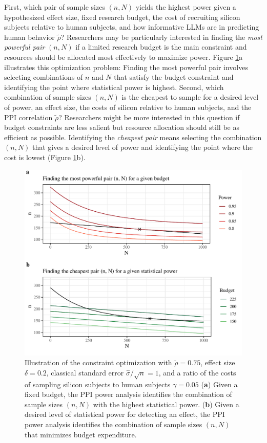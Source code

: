 \documentclass{article}
\begin{document}
First, which pair of sample sizes $(n, N)$ yields the highest power given a hypothesized effect size, fixed research budget, the cost of recruiting silicon subjects relative to human subjects, and how informative LLMs are in predicting human behavior $\tilde{\rho}$? Researchers may be particularly interested in finding the \textit{most powerful pair} $(n, N)$ if a limited research budget is the main constraint and resources should be allocated most effectively to maximize power. Figure \ref{fig:powerful-cheapest-pair}a illustrates this optimization problem: Finding the most powerful pair involves selecting combinations of $n$ and $N$ that satisfy the budget constraint and identifying the point where statistical power is highest.
Second, which combination of sample sizes $(n, N)$ is the cheapest to sample for a desired level of power, an effect size, the costs of silicon relative to human subjects, and the PPI correlation $\tilde{\rho}$? Researchers might be more interested in this question if budget constraints are less salient but resource allocation should still be as efficient as possible. Identifying the \textit{cheapest pair} means selecting the combination $(n, N)$ that gives a desired level of power and identifying the point where the cost is lowest (Figure \ref{fig:powerful-cheapest-pair}b). 

\clearpage
\begin{figure}[p]
    \includegraphics[width=1\linewidth]{9_MostPowerfulAndCheapestPair.pdf}
    \caption{Illustration of the constraint optimization with $\tilde{\rho}=0.75$, effect size $\delta = 0.2$, classical standard error $\hat \sigma/ \sqrt{n} = 1$, and a ratio of the costs of sampling silicon subjects to human subjects $\gamma=0.05$ (\textbf{a}) Given a fixed budget, the PPI power analysis identifies the combination of sample sizes $(n, N)$ with the highest statistical power. (\textbf{b}) Given a desired level of statistical power for detecting an effect, the PPI power analysis identifies the combination of sample sizes $(n, N)$ that minimizes budget expenditure.}
    \label{fig:powerful-cheapest-pair}
\end{figure}
\clearpage
\end{document}
